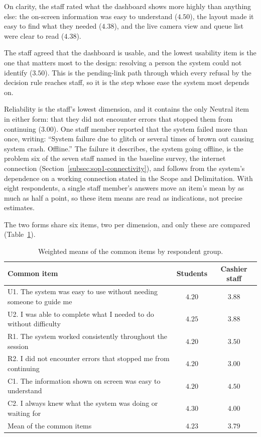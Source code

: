 \documentclass{research}
\begin{document}
On clarity, the staff rated what the dashboard shows more highly
than anything else: the on-screen information was easy to understand
($4.50$), the layout made it easy to find what they needed ($4.38$), and
the live camera view and queue list were clear to read ($4.38$).

The staff agreed that the dashboard is usable, and
the lowest usability item is the one that matters most to the design:
resolving a person the system could not identify ($3.50$). This is the
pending-link path through which every refusal by the decision rule
reaches staff, so it is the step whose ease the system most depends on.

Reliability is the staff's lowest dimension, and it
contains the only Neutral item in either form: that they did not
encounter errors that stopped them from continuing ($3.00$). One staff
member reported that the system failed more than once, writing:
``System failure due to glitch or several times of brown out causing
system crash. Offline.'' The failure it describes, the system going
offline, is the problem six of the seven staff named in the baseline
survey, the internet connection (Section~\ref{subsec:sop1-connectivity}),
and follows from the system's dependence on a working connection stated
in the Scope and Delimitation. With eight
respondents, a single staff member's answers move an item's mean by as
much as half a point, so these item means are read as indications, not
precise estimates.

\label{subsec:sop4-comparison}

The two forms share six items, two per dimension, and only these are
compared (Table~\ref{tab:sop4-common}).

\begin{table}[H]
\centering
\caption{Weighted means of the common items by respondent group.}
\label{tab:sop4-common}
\begin{tabular}{p{}cc}
\hline
Common item & Students & Cashier staff \\
\hline
U1. The system was easy to use without needing someone to guide me
  & $4.20$ & $3.88$ \\
U2. I was able to complete what I needed to do without difficulty
  & $4.25$ & $3.88$ \\
R1. The system worked consistently throughout the session
  & $4.20$ & $3.50$ \\
R2. I did not encounter errors that stopped me from continuing
  & $4.20$ & $3.00$ \\
C1. The information shown on screen was easy to understand
  & $4.20$ & $4.50$ \\
C2. I always knew what the system was doing or waiting for
  & $4.30$ & $4.00$ \\
\hline
Mean of the common items & $4.23$ & $3.79$ \\
\hline
\end{tabular}
\end{table}
\end{document}
